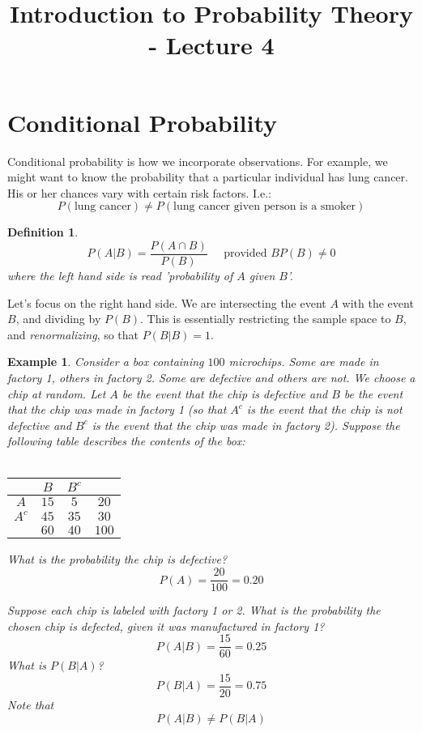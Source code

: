 \documentclass[12pt]{article} %
\title{Introduction to Probability Theory - Lecture 4}
\newtheorem{defn}{Definition}
\newtheorem{example}{Example}
\begin{document}
\maketitle
\section{Conditional Probability}
Conditional probability is how we incorporate observations. For example, we might want to know the probability that a particular individual has lung cancer. His or her chances vary with certain risk factors. I.e.:
$$P(\textrm{lung cancer})\neq P(\textrm{lung cancer given person is a smoker})$$
\begin{defn}
$$P(A|B) = \frac{P(A\cap B)}{P(B)} \;\;\;\;\;\textrm{provided }BP(B)\neq 0$$
where the left hand side is read 'probability of $A$ given $B$'. 
\end{defn}
Let's focus on the right hand side. We are intersecting the event $A$ with the event $B$, and dividing by $P(B)$. This is essentially restricting the sample space to $B$, and \emph{renormalizing}, so that $P(B|B) = 1$.
\begin{example}
Consider a box containing $100$ microchips. Some are made in factory 1, others in factory 2. Some are defective and others are not. We choose a chip at random. Let $A$ be the event that the chip is defective and $B$ be the event that the chip was made in factory 1 (so that $A^c$ is the event that the chip is not defective and $B^c$ is the event that the chip was made in factory 2). Suppose the following table describes the contents of the box:\\\\
\begin{tabular}{c|c c|c}
& $B$ & $B^c$& \\
\hline
$A$& $15$& $5$ &$20$\\
$A^c$& $45$ & $35$ &$30$\\
\hline
& $60$ & $40$ & $100$
\end{tabular}

What is the probability the chip is defective?
$$P(A) = \frac{20}{100} = 0.20$$

Suppose each chip is labeled with factory 1 or 2. What is the probability the chosen chip is defected, given it was manufactured in factory 1?
$$P(A|B) = \frac{15}{60} = 0.25$$
What is $P(B|A)$?
$$P(B|A) = \frac{15}{20} = 0.75$$
Note that
$$P(A|B) \neq P(B|A)$$
\end{example}
\end{document}
